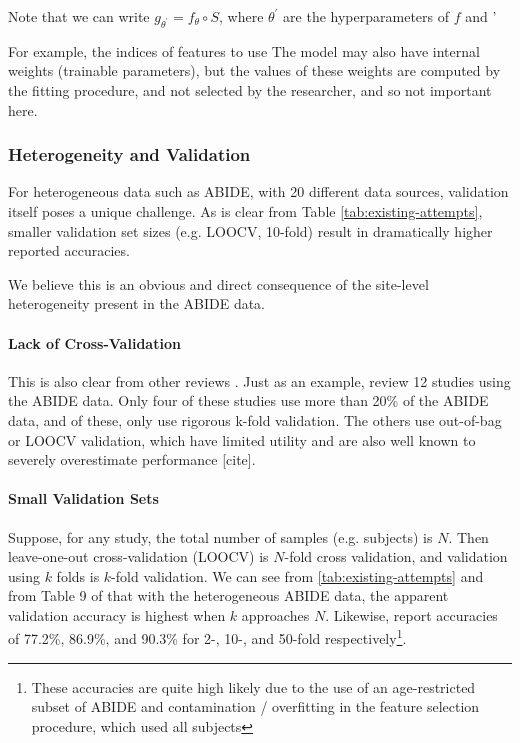 \documentclass[10pt]{article}
\begin{document}
Note that we can write \(g_{\theta^{\prime}} = f_{\theta} \circ S\), where \(\theta^{\prime}\) are the hyperparameters of \(f\) and '

For example, the indices of features to use The model may also have internal weights (trainable parameters), but the
values of these weights are computed by the fitting procedure, and not selected by the researcher, and so not important here.

\subsubsection{Heterogeneity and Validation}

For heterogeneous data such as ABIDE, with 20 different data sources, validation itself poses a
unique challenge. As is clear from Table \ref{tab:existing-attempts}, smaller validation set sizes
(e.g. LOOCV, 10-fold) result in dramatically higher reported accuracies.

We believe this is
an obvious and direct consequence of the site-level heterogeneity present in the ABIDE data.

\paragraph{Lack of Cross-Validation}

This is also clear from other reviews \citep[][Table 9]{sakaiMachineLearningStudies2019}. Just as an
example, \citet{sakaiMachineLearningStudies2019} review 12 studies using the ABIDE data. Only four
of these studies use more than 20\% of the ABIDE data, and of these, only
\citet{heinsfeldIdentificationAutismSpectrum2018} use rigorous k-fold validation. The others use
out-of-bag or LOOCV validation, which have limited utility and are also well known to severely
overestimate performance [cite].

\paragraph{Small Validation Sets}

Suppose, for any study, the total number of samples (e.g. subjects) is \(N\). Then leave-one-out
cross-validation (LOOCV) is \(N\)-fold cross validation, and validation using \(k\) folds is
\(k\)-fold validation. We can see from \ref{tab:existing-attempts} and from Table 9 of
\citet{sakaiMachineLearningStudies2019} that with the heterogeneous ABIDE data, the apparent
validation accuracy is highest when \(k\) approaches \(N\). Likewise,
\citet{iidakaRestingStateFunctional2015} report accuracies of 77.2\%, 86.9\%, and 90.3\% for 2-, 10-,
and 50-fold respectively\footnote{These accuracies are quite high likely due to the use of an
age-restricted subset of ABIDE and contamination / overfitting in the feature selection procedure,
which used all subjects}.
\end{document}

